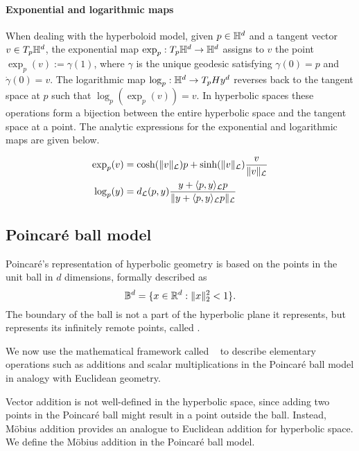 \paragraph{Exponential and logarithmic maps}
When dealing with the hyperboloid model, given $p \in \mathbb{H}^d$ and a tangent vector $v \in T_p\mathbb{H}^d$, the exponential map $\exp_p: T_p\mathbb{H}^d \to \mathbb{H}^d$ assigns to $v$ the point $\exp_p(v) := \gamma(1)$, where $\gamma$ is the unique geodesic satisfying $\gamma(0) = p$ and $\dot{\gamma}(0) = v$. The logarithmic map $\log_p: \mathbb{H}^d \to T_pHy^d$ reverses back to the tangent space at $p$ such that $\log_p(\exp_p(v)) = v$. In hyperbolic spaces these operations form a bijection between the entire hyperbolic space and the tangent space at a point. The analytic expressions for the exponential and logarithmic maps are given below.

\begin{align*}
    \exp_p(v) &= \cosh(\|v\|_{\mathcal{L}})p + \sinh(\|v\|_{\mathcal{L}}) \frac{v}{\|v\|_{\mathcal{L}}}\\
    \log_p(y) &= d_{\mathcal{L}}(p,y)\frac{y + \langle p,y \rangle_{\mathcal{L}}p}{\|y + \langle p,y \rangle_{\mathcal{L}}p\|_{\mathcal{L}}}
\end{align*}

\subsection{Poincaré ball model}\label{sec:poincareBall}
Poincaré's representation of hyperbolic geometry is based on the points in the unit ball in $d$ dimensions, formally described as
\begin{equation*}
    \mathbb{B}^d = \{x \in \mathbb{R}^d: \|x\|^2_2 < 1\}.
\end{equation*}
The boundary of the ball is not a part of the hyperbolic plane it represents, but represents its infinitely remote points, called .

We now use the mathematical framework called ~\cite{ungar2022gyrovectorSpaceHyperbolicGeometry}\cite{Ungar1999HyperbolicPythagoreanTheoremPoincareDiscModel} to describe elementary operations such as additions and scalar multiplications in the Poincaré ball model in analogy with Euclidean geometry.

Vector addition is not well-defined in the hyperbolic space, since adding two points in the Poincaré ball might result in a point outside the ball. Instead, Möbius addition provides an analogue to Euclidean addition for hyperbolic space. We define the Möbius addition in the Poincaré ball model.

